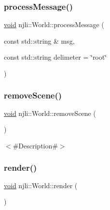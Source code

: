 \mbox{\label{classnjli_1_1_world_a4118fbcbb82b872369b235bbc7cde67f}} 
\subsubsection{\texorpdfstring{process\+Message()}{processMessage()}}
{\footnotesize\ttfamily \mbox{\hyperlink{_thread_8h_af1e856da2e658414cb2456cb6f7ebc66}{void}} njli\+::\+World\+::process\+Message (\begin{DoxyParamCaption}\item[{const std\+::string \&}]{msg,  }\item[{const std\+::string}]{delimeter = {\ttfamily \char`\"{}root\char`\"{}} }\end{DoxyParamCaption})\hspace{0.3cm}{\ttfamily [protected]}}

\mbox{\label{classnjli_1_1_world_aabf2a07e2fab640f5800357ad1fd7717}} 
\subsubsection{\texorpdfstring{remove\+Scene()}{removeScene()}}
{\footnotesize\ttfamily \mbox{\hyperlink{_thread_8h_af1e856da2e658414cb2456cb6f7ebc66}{void}} njli\+::\+World\+::remove\+Scene (\begin{DoxyParamCaption}{ }\end{DoxyParamCaption})}

$<$\#\+Description\#$>$ \mbox{\label{classnjli_1_1_world_a3e7f68f7467d421971e13dfcc5e2100e}} 
\subsubsection{\texorpdfstring{render()}{render()}}
{\footnotesize\ttfamily \mbox{\hyperlink{_thread_8h_af1e856da2e658414cb2456cb6f7ebc66}{void}} njli\+::\+World\+::render (\begin{DoxyParamCaption}{ }\end{DoxyParamCaption})}

